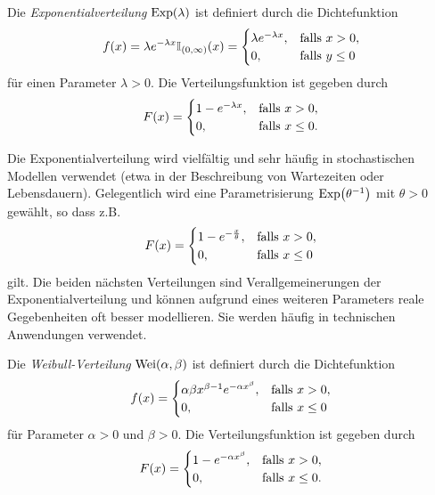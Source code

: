 \documentclass{lecture}
\begin{document}
    \begin{definition}
        Die \emph{Exponentialverteilung} \(\Exp\parentheses*{\lambda}\) ist definiert durch die Dichtefunktion
        \[
            f\parentheses*{x} = \lambda e^{-\lambda x}\mathbb{I}_{\parentheses*{0, \infty}}\parentheses*{x} = \begin{cases}
                \lambda e^{-\lambda x}, & \text{falls }x > 0,\\
                0, & \text{falls }y \le 0
            \end{cases}
        \]
        für einen Parameter \(\lambda > 0\).
        Die Verteilungsfunktion ist gegeben durch
        \[
            F\parentheses*{x} = \begin{cases}
                1 - e^{-\lambda x}, & \text{falls }x > 0,\\
                0, & \text{falls }x \le 0.
            \end{cases}
        \]
    \end{definition}

    Die Exponentialverteilung wird vielfältig und sehr häufig in stochastischen Modellen verwendet (etwa in der Beschreibung von Wartezeiten oder Lebensdauern).
    Gelegentlich wird eine Parametrisierung \(\Exp\parentheses*{\theta^{-1}}\) mit \(\theta > 0\) gewählt, so dass z.B.
    \[
        F\parentheses*{x} = \begin{cases}
            1 - e^{-\frac{x}{\theta}}, & \text{falls }x > 0,\\
            0, & \text{falls }x \le 0
        \end{cases}
    \]
    gilt.
    Die beiden nächsten Verteilungen sind Verallgemeinerungen der Exponentialverteilung und können aufgrund eines weiteren Parameters reale Gegebenheiten oft besser modellieren.
    Sie werden häufig in technischen Anwendungen verwendet.

    \begin{definition}
        Die \emph{Weibull-Verteilung} \(\Wei\parentheses*{\alpha, \beta}\) ist definiert durch die Dichtefunktion
        \[
            f\parentheses*{x} = \begin{cases}
                \alpha\beta x^{\beta - 1}e^{-\alpha x^\beta}, & \text{falls }x > 0,\\
                0, & \text{falls }x \le 0
            \end{cases}
        \]
        für Parameter \(\alpha > 0\) und \(\beta > 0\).
        Die Verteilungsfunktion ist gegeben durch
        \[
            F\parentheses*{x} = \begin{cases}
                1 - e^{-\alpha x^\beta}, & \text{falls }x > 0,\\
                0, & \text{falls }x \le 0.
            \end{cases}
        \]
    \end{definition}
\end{document}
